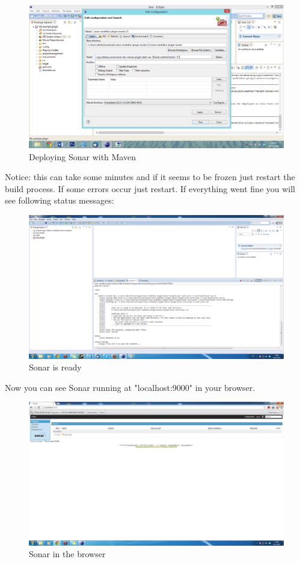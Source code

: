 \begin{figure}
	\centering
		\includegraphics[width=\textwidth]{sonardeploy}
	\caption{Deploying Sonar with Maven}
	\label{fig:sonardeploy}
\end{figure}
 
Notice: this can take some minutes and if it seems to be frozen just restart the build process. If some errors occur just restart.
If everything went fine you will see following status messages:
 
\begin{figure}
	\centering
		\includegraphics[width=\textwidth]{sonarready}
	\caption{Sonar is ready}
	\label{fig:sonarready}
\end{figure}

Now you can see Sonar running at "localhost:9000"  in your browser.

\begin{figure}
	\centering
		\includegraphics[width=\textwidth]{sonarrunning}
	\caption{Sonar in the browser}
	\label{fig:sonarrunning}
\end{figure}



